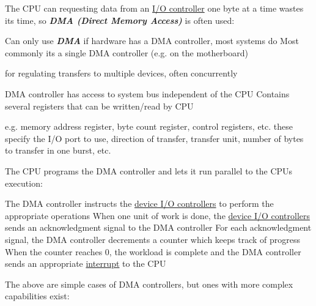 The CPU can requesting data from an \ul{I/O controller} one byte at a time
wastes its time, so \textbf{ \textit{DMA (Direct Memory Access)}} is often
used:

\begin{itemize}

    \vItem
          Can only use \textbf{ \textit{DMA}} if hardware has a DMA controller,
          most systems do
    \vItem
          Most commonly its a single DMA controller (e.g. on the motherboard)

          \begin{itemize}

              \vItem
                    for regulating transfers to multiple devices,
              \vItem
                    often concurrently
          \end{itemize}
    \vItem
          DMA controller has access to system bus independent of the CPU
    \vItem
          Contains several registers that can be written/read by CPU

          \begin{itemize}

              \vItem
                    e.g. memory address register, byte count register, control
                    registers, etc.
              \vItem
                    these specify the I/O port to use, direction of transfer, transfer
                    unit, number of bytes to transfer in one burst, etc.
          \end{itemize}
\end{itemize}

The CPU programs the DMA controller and lets it run parallel to the CPUs
execution:

\begin{itemize}

    \vItem
          The DMA controller instructs the \ul{device I/O controllers} to perform
          the appropriate operations
    \vItem
          When one unit of work is done, the \ul{device I/O controllers} sends an
          acknowledgment signal to the DMA controller
    \vItem
          For each acknowledgment signal, the DMA controller decrements a
          counter which keeps track of progress
    \vItem
          When the counter reaches 0, the workload is complete and the DMA
          controller sends an appropriate \ul{interrupt} to the CPU
\end{itemize}

The above are simple cases of DMA controllers, but ones with more
complex capabilities exist:

